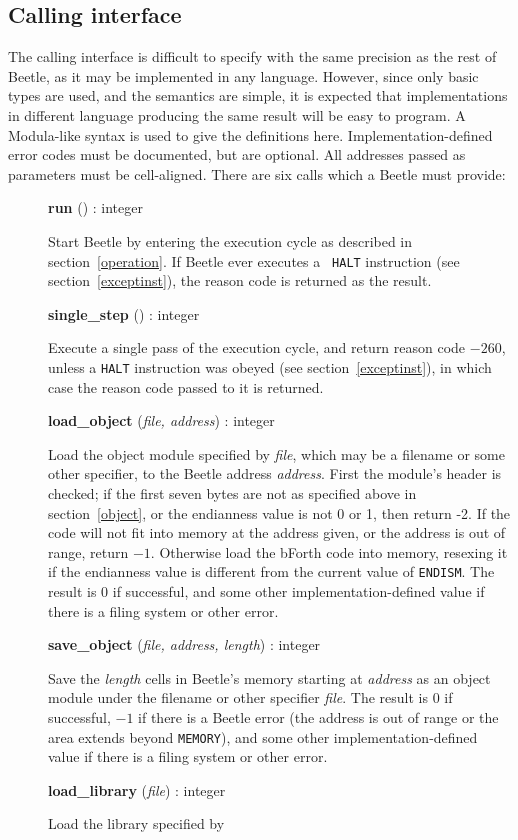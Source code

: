 \documentclass{article}
\newlength{\itemwidth}\itemwidth=\textwidth \advance\itemwidth by -0.1in
\newlength{\innerwidth}\innerwidth=\itemwidth \advance\innerwidth by -0.5in
\newcommand{\iface}[4]{\item[]\parbox{\itemwidth}{{\bf #1} ({\it #2}\/) :
#3\\[0.5ex]\hspace*{0.4in}\parbox{\innerwidth}{#4}}}
\begin{document}
\subsection{Calling interface}
\label{calls}

The calling interface is difficult to specify with the same precision as the
rest of Beetle, as it may be implemented in any language. However, since only
basic types are used, and the semantics are simple, it is expected that
implementations in different language producing the same result will be easy to
program. A Modula-like syntax is used to give the definitions here.
Implementation-defined error codes must be documented, but are optional. All
addresses passed as parameters must be cell-aligned. There are six calls which a
Beetle must provide:

\begin{description}
\iface{run}{}{integer}{Start Beetle by entering the execution cycle as
    described in section~\ref{operation}. If Beetle ever executes a {\tt
    HALT} instruction (see section~\ref{exceptinst}), the reason code is
    returned as the result.}
\iface{single\_step}{}{integer}{Execute a single pass of the execution
    cycle, and return reason code $-260$, unless a {\tt HALT} instruction was
    obeyed (see section~\ref{exceptinst}), in which case the reason code
    passed to it is returned.}
\iface{load\_object}{file, address}{integer}{Load the object module
    specified by \textit{file}, which may be a filename or some other
    specifier, to the Beetle address \textit{address}. First the module's
    header is checked; if the first seven bytes are not as specified above
    in section~\ref{object}, or the endianness value is not 0 or 1, then
    return -2. If the code will not fit into memory at the address given, or the
    address is out of range, return $-1$. Otherwise load the bForth code into
    memory, resexing it if the endianness value is different from the current
    value of {\tt ENDISM}. The result is 0 if successful, and some other
    implementation-defined value if there is a filing system or other error.}
\iface{save\_object}{file, address, length}{integer}{Save the \textit{length}
    cells in Beetle's memory starting at \textit{address} as an object module
    under the filename or other specifier \textit{file}. The result is 0 if
    successful, $-1$ if there is a Beetle error (the address is out of range or
    the area extends beyond {\tt MEMORY}), and some other
    implementation-defined value if there is a filing system or other error.}
\iface{load\_library}{file}{integer}{Load the library specified by
}
\end{description}
\end{document}
